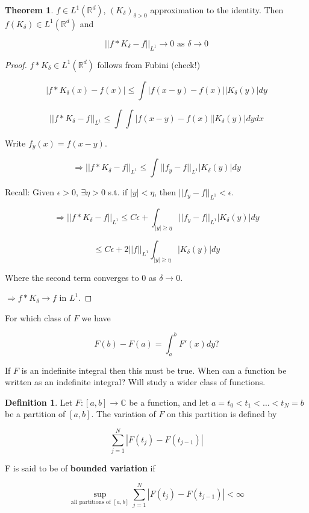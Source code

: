\documentclass{article}
\theoremstyle{definition}
\newtheorem{thm}{Theorem}
\newtheorem{dfn}{Definition}
\begin{document}
\begin{thm}
  $f \in L^1(\mathbb{R}^d)$, $(K_\delta)_{\delta > 0}$ approximation to the identity. Then $f(K_\delta) \in L^1(\mathbb{R}^d)$ and 

  $$||f*K_\delta - f||_{L^1} \rightarrow 0 \text{ as } \delta \rightarrow 0$$
\end{thm}

\begin{proof}
  $f*K_\delta \in L^1(\mathbb{R}^d)$ follows from  Fubini (check!)

  $$|f*K_\delta(x) - f(x)| \leq \int |f(x - y) - f(x)| |K_\delta(y)| dy$$

  $$||f*K_\delta - f||_{L^1} \leq \int \int |f(x - y) - f(x)| |K_\delta(y)|dydx$$

  Write $f_y(x) = f(x - y)$.

  $$\Rightarrow ||f*K_\delta - f||_{L^1} \leq \int ||f_y - f||_{L^1} |K_\delta(y)| dy$$

  Recall: Given $\epsilon > 0$, $\exists \eta > 0$ s.t. if $|y| < \eta$, then $||f_y - f||_{L^1} < \epsilon$.

  $$\Rightarrow ||f*K_\delta - f||_{L^1} \leq C\epsilon + \int_{|y| \geq \eta} ||f_y - f||_{L^1} |K_\delta(y)|dy$$

  $$\leq C \epsilon + 2||f||_{L^1} \int_{|y| \geq \eta} |K_\delta(y)|dy$$

  Where the second term converges to 0 as $\delta \rightarrow 0$.

  $\Rightarrow f*K_\delta \rightarrow f$ in $L^1$. 
\end{proof}

For which class of $F$ we have 

$$F(b) - F(a) = \int_a^b F'(x) dy \text{?}$$

If $F$ is an indefinite integral then this must be true. When can a function be written as an indefinite integral? Will study a wider class of functions. 

\begin{dfn}
  Let $F:[a, b] \rightarrow \mathbb{C}$ be a function, and let $a = t_0 < t_1 < \hdots < t_N = b$ be a partition of $[a, b]$. The variation of $F$ on this partition is defined by 

  $$\sum_{j = 1}^N  |F(t_j) - F(t_{j - 1})|$$

  F is said to be of \textbf{bounded variation} if 

  $$\sup_{\text{all partitions of }[a ,b]} \sum_{j = 1}^N |F(t_j) - F(t_{j - 1})| < \infty $$

\end{dfn}
\end{document}

